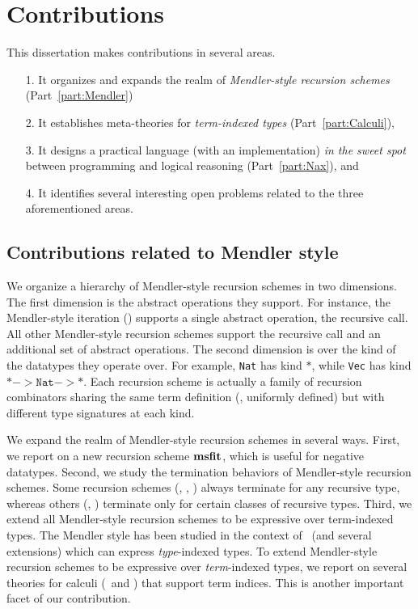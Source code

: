 \section{Contributions}\label{sec:intro:contrib}
This dissertation makes contributions in several areas.
\begin{itemize}
\item[1.]
    It organizes and expands the realm of \emph{Mendler-style recursion schemes}
    (Part~\ref{part:Mendler})

\item[2.] It establishes meta-theories for \emph{term-indexed types}
        (Part~\ref{part:Calculi}),

\item[3.] It designs a practical language (with an implementation)
        \emph{in the sweet spot} between programming and logical reasoning
        (Part~\ref{part:Nax}), and

\item[4.] It identifies several interesting open problems
	related to the three aforementioned areas.
\end{itemize}

\subsection{Contributions related to Mendler style}
We organize a hierarchy of Mendler-style recursion schemes in two dimensions.
The first dimension is the abstract operations they support. For instance,
the Mendler-style iteration (\MIt) supports a single abstract operation,
the recursive call. All other Mendler-style recursion schemes support
the recursive call and an additional set of abstract operations. 
The second dimension is over the kind of the datatypes they operate over.
For example, \texttt{Nat} has kind $*$, while \texttt{Vec}
has kind $* -> \mathtt{Nat} -> *$. Each recursion scheme is actually a
family of recursion combinators sharing the same term definition
(\ie, uniformly defined) but with different type signatures at each kind.

We expand the realm of Mendler-style recursion schemes in several ways.
First, we report on a new recursion scheme $\mathbf{msfit}$, which is useful
for negative datatypes.  Second, we study the termination behaviors
of Mendler-style recursion schemes. Some recursion schemes (\eg, \MIt, \MsfIt)
always terminate for any recursive type, whereas others (\eg, \McvPr) 
terminate only for certain classes of recursive types. Third, we extend
all Mendler-style recursion schemes to be expressive over term-indexed types.
The Mendler style has been studied in the context of \Fw\ (and several
extensions) which can express \emph{type}-indexed types. To extend Mendler-style
recursion schemes to be expressive over \emph{term}-indexed types, we report on
several theories for calculi (\Fi\ and \Fixi) that support term indices.
This is another important facet of our contribution.

